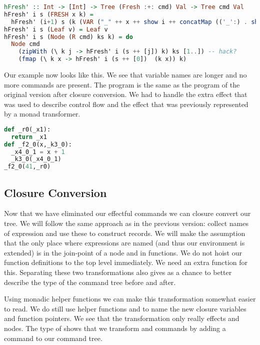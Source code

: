 \begin{lstlisting}[language=Haskell]
hFresh' :: Int -> [Int] -> Tree (Fresh :+: cmd) Val -> Tree cmd Val
hFresh' i s (FRESH x k) =
  hFresh' (i+1) s (k (VAR ("_" ++ x ++ show i ++ concatMap (('_':) . show) s)))
hFresh' i s (Leaf v) = Leaf v
hFresh' i s (Node (R cmd) ks k) = do
  Node cmd
    (zipWith (\ k j -> hFresh' i (s ++ [j]) k) ks [1..]) -- hack?
    (fmap (\ k x -> hFresh' i (s ++ [0])  (k x)) k)
\end{lstlisting}

Our example now looks like this. We see that variable names are longer and no more  commands are present. The program is the same as the program of the original version after closure conversion. We had to handle the extra  effect that was used to describe control flow and the  effect that was previously represented by a monad transformer.

\begin{lstlisting}[language=Python]
def _r0(_x1):
  return _x1
def _f2_0(x,_k3_0):
  _x4_0_1 = x + 1
  _k3_0(_x4_0_1)
_f2_0(41,_r0)
\end{lstlisting}

\subsection{\label{subsection:closconvert2}Closure Conversion}
Now that we have eliminated our effectful commands we can closure convert our tree. We will follow the same approach as in the previous version: collect names of expression and use these to construct records. We will make the assumption that the only place where expressions are named (and thus our environment is extended) is in the join-point of a node and in functions. We do not hoist our function definitions to the top level immediately. We need an extra function for this. Separating these two transformations also gives as a chance to better describe the type of the command tree before and after.

Using monadic helper functions we can make this transformation somewhat easier to read. We do still use helper functions  and  to name the new closure variables and function pointers. We see that the transformation only really effects  and  nodes. The type of  shows that we transform  and  commands by adding a  command to our command tree.

